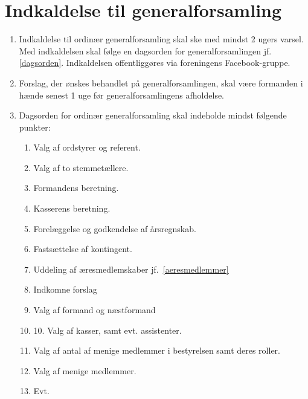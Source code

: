 \documentclass[a4paper, 10pt]{article}
\renewcommand\thesection{\textsection\arabic{section}}
\newenvironment{stykenum}{
  \begin{enumerate}[%
    label=Stk.~\arabic*:, ref=\thesection~Stk.~\arabic{enumi}, start=1]
}{\end{enumerate}}
\begin{document}
\section{Indkaldelse til generalforsamling}
\begin{stykenum}
    \item Indkaldelse til ordinær generalforsamling skal ske med mindst 2 ugers
        varsel. Med indkaldelsen skal følge en dagsorden for generalforsamlingen
        jf. \ref{dagsorden}. Indkaldelsen offentliggøres via foreningens
        Facebook-gruppe.

    \item Forslag, der ønskes behandlet på generalforsamlingen, skal være
        formanden i hænde senest 1 uge før generalforsamlingens afholdelse.

    \item \label{dagsorden} Dagsorden for ordinær generalforsamling skal
        indeholde mindst følgende punkter:
        \begin{enumerate}[label=\arabic*.]
            \item Valg af ordstyrer og referent.

            \item Valg af to stemmetællere.

            \item Formandens beretning.

            \item Kasserens beretning.

            \item Forelæggelse og godkendelse af årsregnskab.

            \item Fastsættelse af kontingent.

            \item Uddeling af æresmedlemskaber jf.~\ref{aeresmedlemmer}

            \item Indkomne forslag

            \item Valg af formand og næstformand

            \item 10. Valg af kasser, samt evt.  assistenter.

            \item Valg af antal af menige medlemmer i bestyrelsen samt deres
                roller.

            \item Valg af menige medlemmer.

            \item Evt.
        \end{enumerate}
\end{stykenum}
\end{document}
